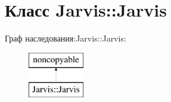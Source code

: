 \hypertarget{classJarvis_1_1Jarvis}{}\section{Класс Jarvis\+:\+:Jarvis}
\label{classJarvis_1_1Jarvis}
Граф наследования\+:Jarvis\+:\+:Jarvis\+:\begin{figure}[H]
\begin{center}
\leavevmode
\includegraphics[height=2.000000cm]{classJarvis_1_1Jarvis}
\end{center}
\end{figure}
